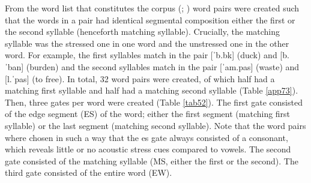 From the word list that constitutes the corpus (\citealt{kluge_papuan_2014}; \citealt{kluge_grammar_2017}) word pairs were created such that the words in a pair had identical segmental composition either the first or the second syllable (henceforth matching syllable). Crucially, the matching syllable was the stressed one in one word and the unstressed one in the other word. For example, the first syllables match in the pair [ˈb.bk] (duck) and [b.ˈban] (burden) and the second syllables match in the pair [ˈam.pas] (waste) and [l.ˈpas] (to free). In total, 32 word pairs were created, of which half had a matching first syllable and half had a matching second syllable (Table \ref{app73}). Then, three gates per word were created (Table \ref{tab52}). The first gate consisted of the edge segment (ES) of the word; either the first segment (matching first syllable) or the last segment (matching second syllable). Note that the word pairs where chosen in such a way that the es gate always consisted of a consonant, which reveals little or no acoustic stress cues compared to vowels. The second gate consisted of the matching syllable (MS, either the first or the second). The third gate consisted of the entire word (EW).\par

